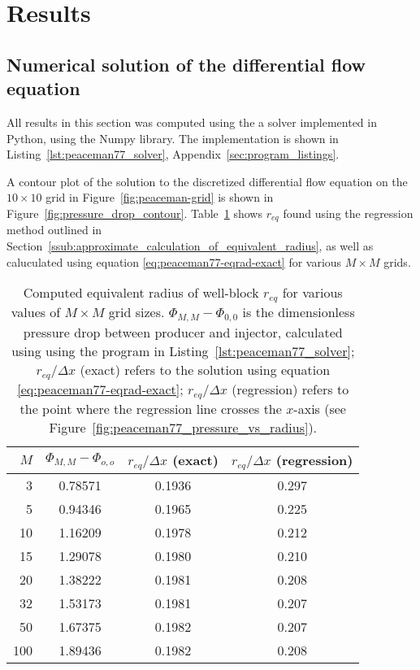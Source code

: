 
\section{Results} %
\label{sec:results}




\subsection{Numerical solution of the differential flow equation} %
\label{sub:numerical_solution_of_the_differential_flow_equation}
All results in this section was computed using the a solver implemented in Python, using the Numpy library. The implementation is shown in Listing~\ref{lst:peaceman77_solver}, Appendix~\ref{sec:program_listings}.

A contour plot of the solution to the discretized differential flow equation on the $10 \times 10$ grid in Figure~\ref{fig:peaceman-grid} is shown in Figure~\ref{fig:pressure_drop_contour}. Table~\ref{tbl:peaceman-results} shows $r_{eq}$ found using the regression method outlined in Section~\ref{ssub:approximate_calculation_of_equivalent_radius}, as well as caluculated using equation \eqref{eq:peaceman77-eqrad-exact} for various $M\times M$ grids.

\begin{table}[htbp]
    \centering
    \caption{Computed equivalent radius of well-block $r_{eq}$ for various values of $M\times M$ grid sizes. $\Phi_{M,M} - \Phi_{0,0}$ is the dimensionless pressure drop between producer and injector, calculated using using the program in Listing~\ref{lst:peaceman77_solver}; $r_{eq}/\Delta x$ (exact) refers to the solution using equation \eqref{eq:peaceman77-eqrad-exact}; $r_{eq} / \Delta x$ (regression) refers to the point where the regression line crosses the $x$-axis (see Figure~\ref{fig:peaceman77_pressure_vs_radius}).}
    \begin{tabular}{r|ccc}
        \toprule
        $M$ & $\Phi_{M,M} - \Phi_{o,o}$ & $r_{eq}/\Delta x$ (exact) & $r_{eq} / \Delta x$ (regression)  \\
        \midrule
        3   & 0.78571 & 0.1936 & 0.297 \\
        5   & 0.94346 & 0.1965 & 0.225 \\
        10  & 1.16209 & 0.1978 & 0.212 \\
        15  & 1.29078 & 0.1980 & 0.210 \\
        20  & 1.38222 & 0.1981 & 0.208 \\
        32  & 1.53173 & 0.1981 & 0.207 \\
        50  & 1.67375 & 0.1982 & 0.207 \\
        100 & 1.89436 & 0.1982 & 0.208 \\
        \bottomrule
    \end{tabular}
    \label{tbl:peaceman-results}
\end{table}

